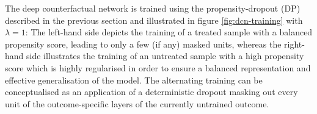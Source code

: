The deep counterfactual network is trained using the propensity-dropout (DP) described in the previous section and illustrated in figure \ref{fig:dcn-training} with $\lambda = 1$: The left-hand side depicts the training of a treated sample with a balanced propensity score, leading to only a few (if any) masked units, whereas the right-hand side illustrates the training of an untreated sample with a high propensity score which is highly regularised in order to ensure a balanced representation and effective generalisation of the model. The alternating training can be conceptualised as an application of a deterministic dropout masking out every unit of the outcome-specific layers of the currently untrained outcome.



